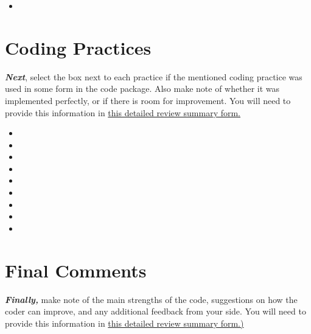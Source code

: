 \documentclass{tufte-handout}
\begin{document}
\begin{fullwidth}
\begin{itemize}
                \item[] 
                
               
			
		\end{itemize}

        \vspace{.6em}

        \section*{Coding Practices}
        \textit{\textbf{Next}}, select the box next to each practice if the mentioned coding practice was used in some form in the code package. Also make note of whether it was implemented perfectly, or if there is room for improvement. You will need to provide this information in \href{https://survey.wb.surveycto.com/collect/code_review_summary?caseid=}{this detailed review summary form.}

        \begin{itemize}
        \item[] 
        \item[] 
        \item[] 
        \item[] 
        \item[] 
        \item[] 
        \item[] 
        \item[] 
        \item[] 
        
        
        \end{itemize}
        \vspace{.6em}

        \section*{Final Comments}
        \textit{\textbf{Finally,}}  make note of the main strengths of the code, suggestions on how the coder can improve, and any additional feedback from your side. You will need to provide this information in \href{https://survey.wb.surveycto.com/collect/code_review_summary?caseid=}{this detailed review summary form.)}


\end{fullwidth}
\end{document}
